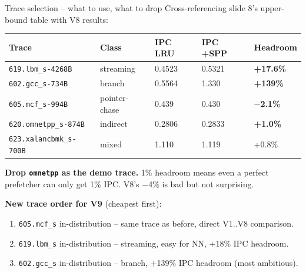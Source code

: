 \documentclass[10pt,aspectratio=169]{beamer}
\begin{document}
\begin{frame}{Trace selection -- what to use, what to drop}
  \footnotesize
  Cross-referencing slide 8's upper-bound table with V8 results:

  \vspace{0.5em}
  \begin{center}
  \scriptsize
  \begin{tabular}{p{2.6cm}p{2.4cm}p{2.0cm}p{2.0cm}p{2.0cm}}
    \toprule
    \textbf{Trace} & \textbf{Class} & \textbf{IPC LRU} & \textbf{IPC +SPP} & \textbf{Headroom} \\
    \midrule
    \texttt{619.lbm\_s-4268B}     & streaming        & 0.4523 & 0.5321 & \textbf{+17.6\%} \\
    \texttt{602.gcc\_s-734B}      & branch           & 0.5564 & 1.330  & \textbf{+139\%} \\
    \texttt{605.mcf\_s-994B}      & pointer-chase    & 0.439  & 0.430  & \textbf{$-$2.1\%} \\
    \texttt{620.omnetpp\_s-874B}  & indirect         & 0.2806 & 0.2833 & \textbf{+1.0\%} \\
    \texttt{623.xalancbmk\_s-700B}& mixed            & 1.110  & 1.119  & +0.8\% \\
    \bottomrule
  \end{tabular}
  \end{center}

  \vspace{0.5em}
  \textbf{Drop \texttt{omnetpp} as the demo trace.} 1\% headroom means even a perfect prefetcher
  can only get 1\% IPC. V8's $-$4\% is bad but not surprising.

  \vspace{0.4em}
  \textbf{New trace order for V9} (cheapest first):
  \begin{enumerate}\scriptsize
    \item \texttt{605.mcf\_s} in-distribution -- same trace as before, direct V1..V8 comparison.
    \item \texttt{619.lbm\_s} in-distribution -- streaming, easy for NN, +18\% IPC headroom.
    \item \texttt{602.gcc\_s} in-distribution -- branch, +139\% IPC headroom (most ambitious).
  \end{enumerate}
\end{frame}
\end{document}
